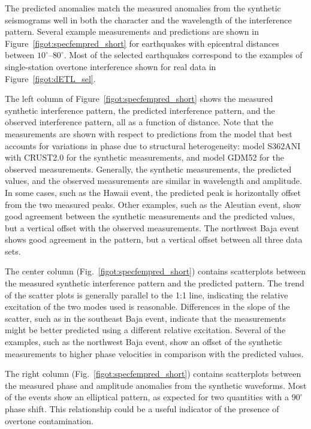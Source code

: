 \documentclass[12pt,oneside]{book}
\newcommand{\degree}[1]{\mbox{$#1^{\circ}$}}
\begin{document}
The predicted anomalies match the measured anomalies from the synthetic seismograms well in both the character and the wavelength of the interference pattern. Several example measurements and predictions are shown in Figure~\ref{figot:specfempred_short} for earthquakes with epicentral distances between \degree{10}--\degree{80}. Most of the selected earthquakes correspond to the examples of single-station overtone interference shown for real data in Figure~\ref{figot:dETL_sel}. 

The left column of Figure~\ref{figot:specfempred_short} shows the measured synthetic interference pattern, the predicted interference pattern, and the observed interference pattern, all as a function of distance. Note that the measurements are shown with respect to predictions from the model that best accounts for variations in phase due to structural heterogeneity: model S362ANI with CRUST2.0 for the synthetic measurements, and model GDM52 for the observed measurements. Generally, the synthetic measurements, the predicted values, and the observed measurements are similar in wavelength and amplitude. In some cases, such as the Hawaii event, the predicted peak is horizontally offset from the two measured peaks. Other examples, such as the Aleutian event, show good agreement between the synthetic measurements and the predicted values, but a vertical offset with the observed measurements. The northwest Baja event shows good agreement in the pattern, but a vertical offset between all three data sets. 

The center column (Fig.~\ref{figot:specfempred_short}) contains scatterplots between the measured synthetic interference pattern and the predicted pattern. The trend of the scatter plots is generally parallel to the 1:1 line, indicating the relative excitation of the two modes used is reasonable. Differences in the slope of the scatter, such as in the southeast Baja event, indicate that the measurements might be better predicted using a different relative excitation. Several of the examples, such as the northwest Baja event, show an offset of the synthetic measurements to higher phase velocities in comparison with the predicted values. 

The right column (Fig.~\ref{figot:specfempred_short}) contains scatterplots between the measured phase and amplitude anomalies from the synthetic waveforms. Most of the events show an elliptical pattern, as expected for two quantities with a \degree{90} phase shift. This relationship could be a useful indicator of the presence of overtone contamination. 
\end{document}
